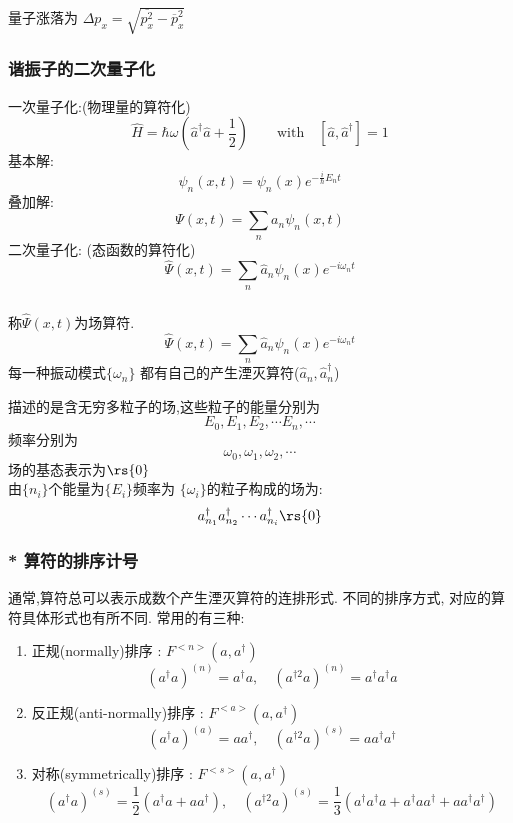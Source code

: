 \begin{frame}
    \frametitle{}
    量子涨落为 $\Delta p_x  = \sqrt{ \overline{p^2 _x}- \overline{p}_x ^2}$ \\ 
\end{frame}

\begin{frame} 
\frametitle{谐振子的二次量子化}
{\Bullet}一次量子化:(物理量的算符化)
\[  \hat{H}= \hbar \omega \left(\hat{a}^\dagger \hat{a} + \frac{1 }{2}\right) \qquad \text{with} \quad [\hat{a},\hat{a}^\dagger]=1 \]
基本解:
\[ \psi_n(x,t) = \psi_n(x)e^{-\frac{i}{\hbar} E_n t }\]  
叠加解:
\[ \Psi (x,t) = \sum_n a_n \psi_n(x,t)\] 
{\Bullet}二次量子化: (态函数的算符化)
\[ \hat{\Psi } (x,t) = \sum_n \hat{a}_n \psi_n(x) e^{-i \omega_n t}\] 
\end{frame}

\begin{frame} 
\frametitle{}
称$\hat{\Psi } (x,t)$为场算符. 
\[ \hat{\Psi } (x,t) = \sum_n \hat{a}_n \psi_n(x) e^{-i \omega_n t}\]      
每一种振动模式$\{ \omega_n \}$ 都有自己的产生湮灭算符($\hat{a}_n, \hat{a}^{\dagger} _n$)\\ \vspace*{0.6em}

描述的是含无穷多粒子的场,这些粒子的能量分别为
\[ E_0, E_1, E_2, \cdots E_n, \cdots \]
频率分别为\[\omega_0, \omega_1, \omega_2, \cdots\] 
场的基态表示为$\rs{0}$ \\ 
由$\{n_i\}$个能量为$\{E_i\}$频率为 $\{\omega_i\}$的粒子构成的场为:
\[ a^{\dagger} _{n_1} a^{\dagger} _{n_2}\cdots a^{\dagger} _{n_i} \rs{0}\]
\end{frame}

\begin{frame} 
    \frametitle{* 算符的排序计号}
    通常,算符总可以表示成数个产生湮灭算符的连排形式. 不同的排序方式, 对应的算符具体形式也有所不同. 常用的有三种: \\
    \begin{enumerate}
      \item 正规(normally)排序 : ${F}^{<n>} (a, a^{\dagger})$ \[ (a^{\dagger} a)^{(n)} = a^{\dagger} a, \quad (a^{\dagger 2} a)^{(n)} = a^{\dagger} a^{\dagger} a\]
      \item 反正规(anti-normally)排序 : ${F}^{<a>} (a, a^{\dagger})$ \[ (a^{\dagger} a)^{(a)} = aa^{\dagger} , \quad (a^{\dagger 2} a)^{(s)} = a a^{\dagger} a^{\dagger} \]
      \item 对称(symmetrically)排序 : ${F}^{<s>} (a, a^{\dagger})$ \[ (a^{\dagger} a)^{(s)} = \frac{1}{2}(a^{\dagger} a + aa^{\dagger}) , \quad (a^{\dagger 2} a)^{(s)} = \frac{1}{3}(a^{\dagger} a^{\dagger} a+  a^{\dagger} a a^{\dagger} + a a^{\dagger} a^{\dagger} ) \]
    \end{enumerate}
\end{frame}

